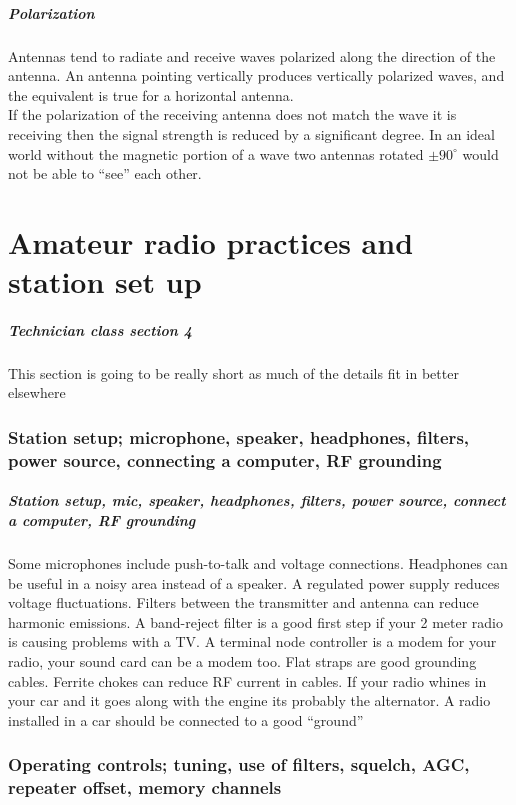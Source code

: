 \documentclass[10pt, handout]{beamer}
\begin{document}
\begin{frame}
\frametitle{Polarization}
Antennas tend to radiate and receive waves polarized along the direction of the antenna. An antenna pointing vertically produces vertically polarized waves, and the equivalent is true for a horizontal antenna.\\
If the polarization of the receiving antenna does not match the wave it is receiving then the signal strength is reduced by a significant degree. In an ideal world without the magnetic portion of a wave two antennas rotated $\pm90^{\circ}$ would not be able to ``see'' each other.
\end{frame}


\part{Amateur radio practices and station set up}


\begin{frame}
\frametitle{Technician class section 4}
This section is going to be really short as much of the details fit in better elsewhere
\end{frame}

\section{Station setup; microphone, speaker, headphones, filters, power source, connecting a computer, RF grounding}

\begin{frame}
\frametitle{Station setup, mic, speaker, headphones, filters, power source, connect a computer, RF grounding}
Some microphones include push-to-talk and voltage connections. Headphones can be useful in a noisy area instead of a speaker. A regulated power supply reduces voltage fluctuations. Filters between the transmitter and antenna can reduce harmonic emissions. A band-reject filter is a good first step if your 2 meter radio is causing problems with a TV. A terminal node controller is a modem for your radio, your sound card can be a modem too. Flat straps are good grounding cables. Ferrite chokes can reduce RF current in cables. If your radio whines in your car and it goes along with the engine its probably the alternator. A radio installed in a car should be connected to a good ``ground''
\end{frame}

\section{Operating controls; tuning, use of filters, squelch, AGC, repeater offset, memory channels}
\end{document}
